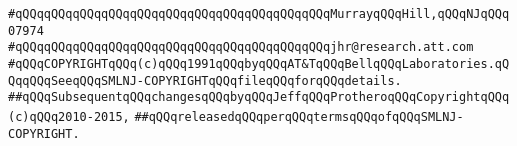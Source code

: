 \verb|#qQQqqQQqqQQqqQQqqQQqqQQqqQQqqQQqqQQqqQQqqQQqMurrayqQQqHill,qQQqNJqQQq07974|\newline
\verb|#qQQqqQQqqQQqqQQqqQQqqQQqqQQqqQQqqQQqqQQqqQQqjhr@research.att.com|\newline
\newline
\verb|#qQQqCOPYRIGHTqQQq(c)qQQq1991qQQqbyqQQqAT&TqQQqBellqQQqLaboratories.qQQqqQQqSeeqQQqSMLNJ-COPYRIGHTqQQqfileqQQqforqQQqdetails.|\newline
\verb|##qQQqSubsequentqQQqchangesqQQqbyqQQqJeffqQQqProtheroqQQqCopyrightqQQq(c)qQQq2010-2015,|\newline
\verb|##qQQqreleasedqQQqperqQQqtermsqQQqofqQQqSMLNJ-COPYRIGHT.|\newline

